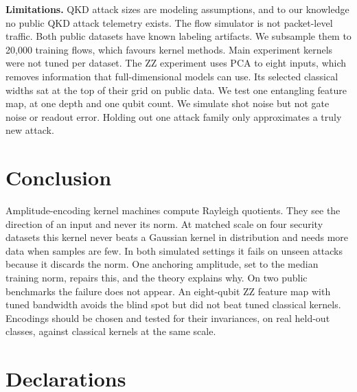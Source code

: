 \documentclass[pdflatex,sn-mathphys-num,lineno]{sn-jnl}
\theoremstyle{thmstyleone}
\begin{document}
\textbf{Limitations.} QKD attack sizes are modeling assumptions, and to our
knowledge no public QKD attack telemetry exists. The flow simulator is not
packet-level traffic. Both public datasets have known labeling artifacts. We
subsample them to 20,000 training flows, which favours kernel methods. Main
experiment kernels were not tuned per dataset. The ZZ experiment uses PCA to eight
inputs, which removes information that full-dimensional models can use. Its
selected classical widths sat at the top of their grid on public data. We test one
entangling feature map, at one depth and one qubit count. We
simulate shot noise but not gate noise or readout error. Holding out one attack
family only approximates a truly new attack.

\section{Conclusion}

Amplitude-encoding kernel machines compute Rayleigh quotients. They see the
direction of an input and never its norm. At matched scale on four security
datasets this kernel never beats a Gaussian kernel in distribution and needs more
data when samples are few. In both simulated settings it fails on unseen attacks
because it discards the norm. One anchoring amplitude, set to the median training
norm, repairs this, and the theory explains why. On two public benchmarks the
failure does not appear. An eight-qubit ZZ feature map with tuned bandwidth avoids
the blind spot but did not beat tuned classical kernels. Encodings should be chosen and tested for their
invariances, on real held-out classes, against classical kernels at the same scale.

\backmatter

\section*{Declarations}
\end{document}
